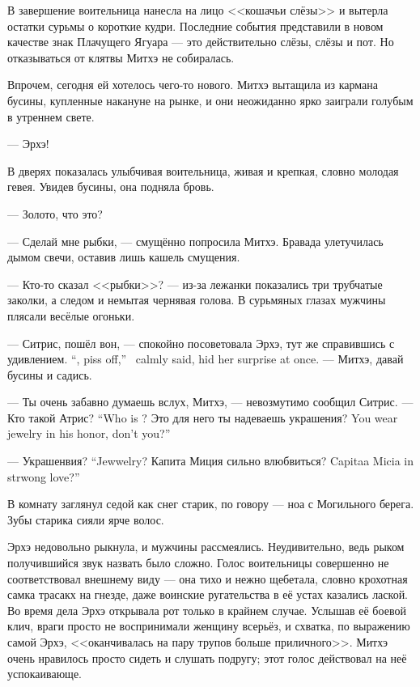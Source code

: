 В завершение воительница нанесла на лицо <<кошачьи слёзы>> и вытерла остатки сурьмы о короткие кудри.
Последние события представили в новом качестве знак Плачущего Ягуара --- это действительно слёзы, слёзы и пот.
Но отказываться от клятвы Митхэ не собиралась.

Впрочем, сегодня ей хотелось чего-то нового.
Митхэ вытащила из кармана бусины, купленные накануне на рынке, и они неожиданно ярко заиграли голубым в утреннем свете.

--- Эрхэ!

В дверях показалась улыбчивая воительница, живая и крепкая, словно молодая гевея.
Увидев бусины, она подняла бровь.

--- Золото, что это?

--- Сделай мне рыбки, --- смущённо попросила Митхэ.
Бравада улетучилась дымом свечи, оставив лишь кашель смущения.

--- Кто-то сказал <<рыбки>>? --- из-за лежанки показались три трубчатые заколки, а следом и немытая чернявая голова.
В сурьмяных глазах мужчины плясали весёлые огоньки.

{--- Ситрис, пошёл вон, --- спокойно посоветовала Эрхэ, тут же справившись с удивлением.}
{``\Sitris, piss off,'' \Oerchoe\ calmly said, hid her surprise at once.}
--- Митхэ, давай бусины и садись.

--- Ты очень забавно думаешь вслух, Митхэ, --- невозмутимо сообщил Ситрис.
{--- Кто такой Атрис?}
{``Who is \Aatris?}
{Это для него ты надеваешь украшения?}
{You wear jewelry in his honor, don't you?''}

{--- Украшенвия?}
{``Jewwelry?}
{Капита Миция сильно влюбвиться?}
{Capitaa Micia in strwong love?'' }

В комнату заглянул седой как снег старик, по говору --- ноа с Могильного берега.
Зубы старика сияли ярче волос.

Эрхэ недовольно рыкнула, и мужчины рассмеялись.
Неудивительно, ведь рыком получившийся звук назвать было сложно.
Голос воительницы совершенно не соответствовал внешнему виду --- она тихо и нежно щебетала, словно крохотная самка трасакх на гнезде, даже воинские ругательства в её устах казались лаской.
Во время дела Эрхэ открывала рот только в крайнем случае.
Услышав её боевой клич, враги просто не воспринимали женщину всерьёз, и схватка, по выражению самой Эрхэ, <<оканчивалась на пару трупов больше приличного>>.
Митхэ очень нравилось просто сидеть и слушать подругу;
этот голос действовал на неё успокаивающе.

